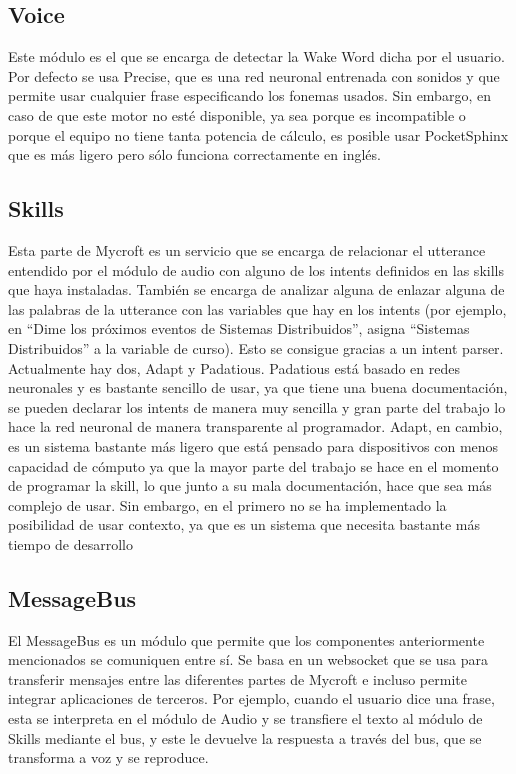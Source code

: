 \subsection{Voice}
Este módulo es el que se encarga de detectar la Wake Word dicha por el usuario. Por defecto se usa Precise, que es una red neuronal entrenada con sonidos y que permite usar cualquier frase especificando los fonemas usados. Sin embargo, en caso de que este motor no esté disponible, ya sea porque es incompatible o porque el equipo no tiene tanta potencia de cálculo, es posible usar PocketSphinx que es más ligero pero sólo funciona correctamente en inglés.
\subsection{Skills}
Esta parte de Mycroft es un servicio que se encarga de relacionar el utterance entendido por el módulo de audio con alguno de los intents definidos en las skills que haya instaladas. También se encarga de analizar alguna de enlazar alguna de las palabras de la utterance con las variables que hay en los intents (por ejemplo, en ``Dime los próximos eventos de Sistemas Distribuidos'', asigna ``Sistemas Distribuidos'' a la variable de curso). Esto se consigue gracias a un intent parser.
Actualmente hay dos, Adapt y Padatious. Padatious está basado en redes neuronales y es bastante sencillo de usar, ya que tiene una buena documentación, se pueden declarar los intents de manera muy sencilla y gran parte del trabajo lo hace la red neuronal de manera transparente al programador. Adapt, en cambio, es un sistema bastante más ligero que está pensado para dispositivos con menos capacidad de cómputo ya que la mayor parte del trabajo se hace en el momento de programar la skill, lo que junto a su mala documentación, hace que sea más complejo de usar. Sin embargo, en el primero no se ha implementado la posibilidad de usar contexto, ya que es un sistema que necesita bastante más tiempo de desarrollo
\subsection{MessageBus}
El MessageBus es un módulo que permite que los componentes anteriormente mencionados se comuniquen entre sí. Se basa en un websocket que se usa para transferir mensajes entre las diferentes partes de Mycroft e incluso permite integrar aplicaciones de terceros. Por ejemplo, cuando el usuario dice una frase, esta se interpreta en el módulo de Audio y se transfiere el texto al módulo de Skills mediante el bus, y este le devuelve la respuesta a través del bus, que se transforma a voz y se reproduce.

